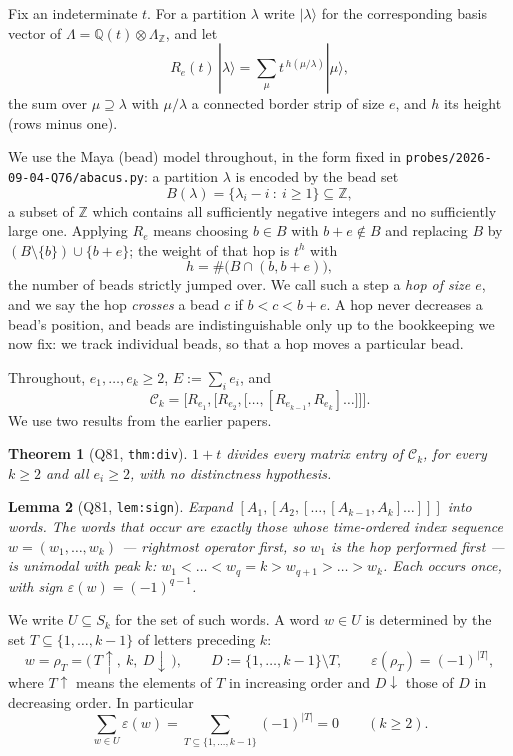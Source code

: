 \documentclass[11pt]{article}
\newtheorem{theorem}{Theorem}
\newtheorem{lemma}[theorem]{Lemma}
\theoremstyle{definition}
\newcommand{\Ck}{\mathcal{C}}
\newcommand{\Z}{\mathbb{Z}}
\newcommand{\Q}{\mathbb{Q}}
\begin{document}
Fix an indeterminate $t$.  For a partition $\lambda$ write $|\lambda\rangle$ for the
corresponding basis vector of $\Lambda=\Q(t)\otimes\Lambda_\Z$, and let
\[
  R_e(t)\,|\lambda\rangle=\sum_{\mu}t^{\,h(\mu/\lambda)}|\mu\rangle,
\]
the sum over $\mu\supseteq\lambda$ with $\mu/\lambda$ a connected border strip of size
$e$, and $h$ its height (rows minus one).

We use the Maya (bead) model throughout, in the form fixed in
\texttt{probes/2026-09-04-Q76/abacus.py}: a partition $\lambda$ is encoded by the
bead set
\[
  B(\lambda)=\{\lambda_i-i\ :\ i\ge1\}\subseteq\Z ,
\]
a subset of $\Z$ which contains all sufficiently negative integers and no
sufficiently large one.  Applying $R_e$ means choosing $b\in B$ with $b+e\notin B$
and replacing $B$ by $(B\setminus\{b\})\cup\{b+e\}$; the weight of that hop is
$t^{h}$ with
\[
  h=\#\bigl(B\cap(b,b+e)\bigr),
\]
the number of beads strictly jumped over.  We call such a step a \emph{hop of size
$e$}, and we say the hop \emph{crosses} a bead $c$ if $b<c<b+e$.  A hop never
decreases a bead's position, and beads are indistinguishable only up to the
bookkeeping we now fix: we track individual beads, so that a hop moves a
particular bead.

Throughout, $e_1,\dots,e_k\ge2$, $E:=\sum_ie_i$, and
\[
  \Ck_k=\bigl[R_{e_1},\bigl[R_{e_2},\bigl[\dots,[R_{e_{k-1}},R_{e_k}]\dots\bigr]\bigr]\bigr].
\]
We use two results from the earlier papers.

\begin{theorem}[Q81, \texttt{thm:div}]\label{thm:div}
$1+t$ divides every matrix entry of $\Ck_k$, for every $k\ge2$ and all $e_i\ge2$,
with no distinctness hypothesis.
\end{theorem}

\begin{lemma}[Q81, \texttt{lem:sign}]\label{lem:sign}
Expand $[A_1,[A_2,[\dots,[A_{k-1},A_k]\dots]]]$ into words.  The words that occur are
exactly those whose time-ordered index sequence $w=(w_1,\dots,w_k)$ --- rightmost
operator first, so $w_1$ is the hop performed first --- is unimodal with peak $k$:
$w_1<\dots<w_q=k>w_{q+1}>\dots>w_k$.  Each occurs once, with sign
$\varepsilon(w)=(-1)^{q-1}$.
\end{lemma}

We write $U\subseteq S_k$ for the set of such words.  A word $w\in U$ is determined by
the set $T\subseteq\{1,\dots,k-1\}$ of letters preceding $k$:
\begin{equation}\label{eq:rhoT}
  w=\rho_T=\bigl(\,T\uparrow,\ k,\ D\downarrow\,\bigr),\qquad D:=\{1,\dots,k-1\}\setminus T,
  \qquad \varepsilon(\rho_T)=(-1)^{|T|},
\end{equation}
where $T\uparrow$ means the elements of $T$ in increasing order and $D\downarrow$ those
of $D$ in decreasing order.  In particular
\begin{equation}\label{eq:signsumzero}
  \sum_{w\in U}\varepsilon(w)=\sum_{T\subseteq\{1,\dots,k-1\}}(-1)^{|T|}=0
  \qquad(k\ge2).
\end{equation}
\end{document}
